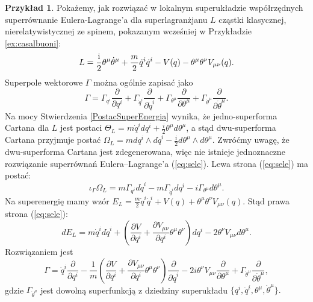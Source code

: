 \documentclass[11pt,a4paper]{report}
\theoremstyle{definition}
\newtheorem{example}[theorem]{Przykład}
\begin{document}
\begin{example}
\label{ex:superfield}
Pokażemy, jak rozwiązać w lokalnym superukładzie współrzędnych superrównanie Eulera-Lagrange'a dla superlagranżjanu $L$ cząstki klasycznej, nierelatywistycznej ze spinem, pokazanym wcześniej w Przykładzie \ref{ex:casalbuoni}:
\begin{equation*}
 L = \frac{\rm i}{2} \theta^\mu \dot{\theta}^\mu + \frac{m}{2} \dot{q}^i \dot{q}^i   - V({q}) - \theta^\mu \theta^\nu V_{\mu \nu} ({q}).
\end{equation*}
Superpole wektorowe $\Gamma$ można ogólnie zapisać jako $$\Gamma= \Gamma_{q^i} \frac{\partial}{\partial q^i} + \Gamma_{\dot q^i} \frac{\partial}{\partial \dot q^i} + \Gamma_{\theta^\mu} \frac{\partial}{\partial \theta^\mu} + \Gamma_{\dot \theta^\mu} \frac{\partial}{\partial \dot \theta^\mu}.$$ Na mocy Stwierdzenia \ref{PostacSuperEnergia} wynika, \.ze jedno-superforma Cartana dla $L$ jest postaci $\Theta_L = m \dot q^i dq^i + \frac{i}{2} \theta^\mu d \theta^\mu$, a stąd dwu-superforma Cartana przyjmuje postać $\Omega_L = m dq^i \wedge d\dot q^i - \frac{i}{2} d\theta^\mu \wedge d\theta^\mu$. Zwróćmy uwagę, że dwu-superforma Cartana jest zdegenerowana, więc nie istnieje jednoznaczne rozwiązanie superr\'owna\'n Eulera--Lagrange'a (\ref{eq:sele}). Lewa strona (\ref{eq:sele}) ma postać:
\begin{equation*}
 \iota_{\Gamma} \Omega_L = m \Gamma_{q^i} d \dot q^i - m \Gamma_{\dot q^i} dq^i - i\Gamma_{\theta^\mu} d \theta^\mu.
\end{equation*}
Na superenergię mamy wzór $E_L = \frac{m}{2} \dot q^i \dot q^i + V({q}) + \theta^\mu \theta^\nu V_{\mu \nu}({q}).$ Stąd prawa strona (\ref{eq:sele}):
\begin{equation*}
 dE_L = m \dot q^i d \dot q^i + \left( \frac{\partial V}{\partial q^i} + \frac{\partial V_{\mu \nu}}{\partial q^i} \theta^\mu \theta^\nu \right)dq^i - 2 \theta^\nu V_{\mu \nu} d\theta^\mu.
\end{equation*}
Rozwiązaniem jest
\begin{equation*}
 \Gamma = \dot{q}^i \frac{\partial}{\partial q^i} - \frac{1}{m} \left( \frac{\partial V}{\partial q^i} + \frac{\partial V_{\mu \nu}}{\partial q^i} \theta^\mu \theta^\nu \right) \frac{\partial}{\partial \dot q^i} - 2i \theta^\nu V_{\mu \nu} \frac{\partial}{\partial \theta^\mu} + \Gamma_{\dot \theta^\mu} \frac{\partial}{\partial \dot \theta^\mu},
\end{equation*}
gdzie $\Gamma_{\dot \theta^\mu}$ jest dowolną superfunkcją z dziedziny superukładu $\{ q^i, \dot q^i, \theta^\mu, \dot \theta^\mu \}.$ 


\end{example}
\end{document}
